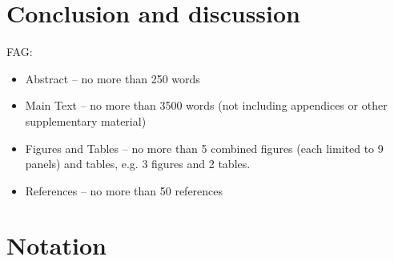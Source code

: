 \documentclass[preprint2]{aastex63}
\newcommand{\fag}[1]{\textcolor{midgreen}{FAG: #1}}
\begin{document}
\section{Conclusion and discussion}\label{sec:conc}

{}


\appendix
\fag{
\begin{itemize}
\item
    Abstract – no more than 250 words
\item
    Main Text – no more than 3500 words (not including appendices or other supplementary material)
\item
    Figures and Tables – no more than 5 combined figures (each limited to 9 panels) and tables, e.g. 3 figures and 2 tables.
\item
    References – no more than 50 references
\end{itemize}}

\section{Notation}\label{sec:table}
\end{document}
